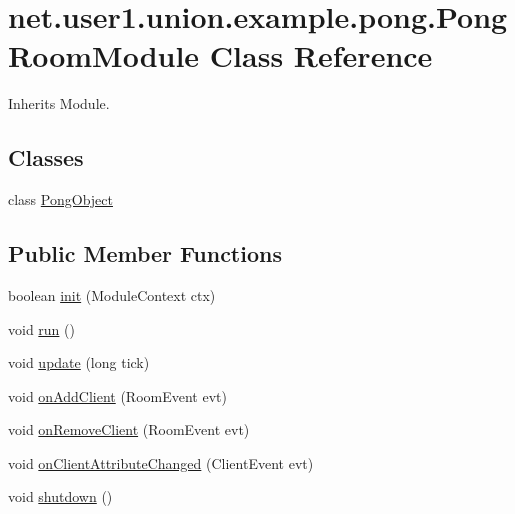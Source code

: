 \hypertarget{classnet_1_1user1_1_1union_1_1example_1_1pong_1_1PongRoomModule}{\section{net.\-user1.\-union.\-example.\-pong.\-Pong\-Room\-Module \-Class \-Reference}
\label{classnet_1_1user1_1_1union_1_1example_1_1pong_1_1PongRoomModule}
}


\-Inherits \-Module.

\subsection*{\-Classes}
\begin{DoxyCompactItemize}
\item 
class \hyperlink{classnet_1_1user1_1_1union_1_1example_1_1pong_1_1PongRoomModule_1_1PongObject}{\-Pong\-Object}
\end{DoxyCompactItemize}
\subsection*{\-Public \-Member \-Functions}
\begin{DoxyCompactItemize}
\item 
boolean \hyperlink{classnet_1_1user1_1_1union_1_1example_1_1pong_1_1PongRoomModule_ae3742a35e50b079361cb7e8330a431ae}{init} (\-Module\-Context ctx)
\item 
void \hyperlink{classnet_1_1user1_1_1union_1_1example_1_1pong_1_1PongRoomModule_aca4e47a62f858adbf2723616bbd5a656}{run} ()
\item 
void \hyperlink{classnet_1_1user1_1_1union_1_1example_1_1pong_1_1PongRoomModule_a9d008e2816d3e026e2c9f776ac843d49}{update} (long tick)
\item 
void \hyperlink{classnet_1_1user1_1_1union_1_1example_1_1pong_1_1PongRoomModule_aefa06e810d78da8fa7e053eeb706a77b}{on\-Add\-Client} (\-Room\-Event evt)
\item 
void \hyperlink{classnet_1_1user1_1_1union_1_1example_1_1pong_1_1PongRoomModule_a3fe55e782e6d451160006755887a64d6}{on\-Remove\-Client} (\-Room\-Event evt)
\item 
void \hyperlink{classnet_1_1user1_1_1union_1_1example_1_1pong_1_1PongRoomModule_ac872f7200437bc87a7fde76438b96f25}{on\-Client\-Attribute\-Changed} (\-Client\-Event evt)
\item 
void \hyperlink{classnet_1_1user1_1_1union_1_1example_1_1pong_1_1PongRoomModule_a6eb7687b982367172b704928dee8016b}{shutdown} ()
\end{DoxyCompactItemize}


